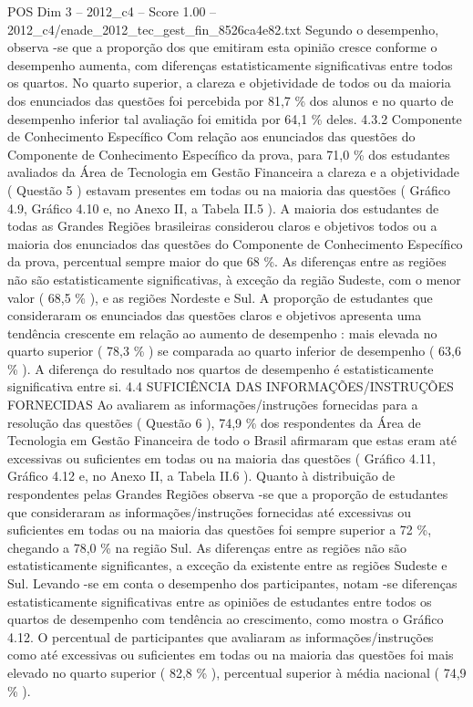 \begin{textsample}{POS Dim 3 – 2012\_c4 – Score 1.00 – 2012\_c4/enade\_2012\_tec\_gest\_fin\_8526ca4e82.txt}
Segundo o desempenho, observa -se que a proporção dos que emitiram esta opinião cresce conforme o desempenho aumenta, com diferenças estatisticamente significativas entre todos os quartos.
No quarto superior, a clareza e objetividade de todos ou da maioria dos enunciados das questões foi percebida por 81,7 \% dos alunos e no quarto de desempenho inferior tal avaliação foi emitida por 64,1 \% deles. 4.3.2 Componente de Conhecimento Específico Com relação aos enunciados das questões do Componente de Conhecimento Específico da prova, para 71,0 \% dos estudantes avaliados da Área de Tecnologia em Gestão Financeira a clareza e a objetividade ( Questão 5 ) estavam presentes em todas ou na maioria das questões ( Gráfico 4.9, Gráfico 4.10 e, no Anexo II, a Tabela II.5 ).
A maioria dos estudantes de todas as Grandes Regiões brasileiras considerou claros e objetivos todos ou a maioria dos enunciados das questões do Componente de Conhecimento Específico da prova, percentual sempre maior do que 68 \%.
As diferenças entre as regiões não são estatisticamente significativas, à exceção da região Sudeste, com o menor valor ( 68,5 \% ), e as regiões Nordeste e Sul.
A proporção de estudantes que consideraram os enunciados das questões claros e objetivos apresenta uma tendência crescente em relação ao aumento de desempenho : mais elevada no quarto superior ( 78,3 \% ) se comparada ao quarto inferior de desempenho ( 63,6 \% ).
A diferença do resultado nos quartos de desempenho é estatisticamente significativa entre si. 4.4 SUFICIÊNCIA DAS INFORMAÇÕES/INSTRUÇÕES FORNECIDAS Ao avaliarem as informações/instruções fornecidas para a resolução das questões ( Questão 6 ), 74,9 \% dos respondentes da Área de Tecnologia em Gestão Financeira de todo o Brasil afirmaram que estas eram até excessivas ou suficientes em todas ou na maioria das questões ( Gráfico 4.11, Gráfico 4.12 e, no Anexo II, a Tabela II.6 ).
Quanto à distribuição de respondentes pelas Grandes Regiões observa -se que a proporção de estudantes que consideraram as informações/instruções fornecidas até excessivas ou suficientes em todas ou na maioria das questões foi sempre superior a 72 \%, chegando a 78,0 \% na região Sul.
As diferenças entre as regiões não são estatisticamente significantes, a exceção da existente entre as regiões Sudeste e Sul.
Levando -se em conta o desempenho dos participantes, notam -se diferenças estatisticamente significativas entre as opiniões de estudantes entre todos os quartos de desempenho com tendência ao crescimento, como mostra o Gráfico 4.12.
O percentual de participantes que avaliaram as informações/instruções como até excessivas ou suficientes em todas ou na maioria das questões foi mais elevado no quarto superior ( 82,8 \% ), percentual superior à média nacional ( 74,9 \% ).

\end{textsample}
